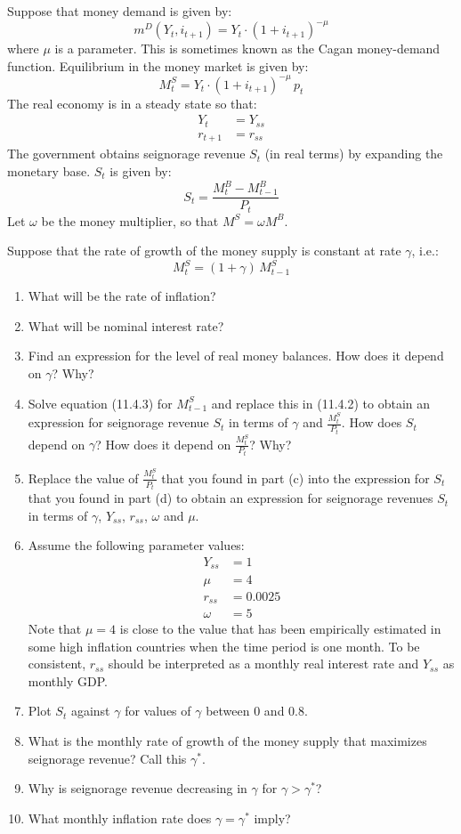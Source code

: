 \noindent Suppose that money demand is given by:
\[
m^D(Y_t,i_{t+1})=Y_t\cdot(1+i_{t+1})^{-\mu}
\]
where $\mu$ is a parameter. This is sometimes known as the Cagan money-demand function. Equilibrium in the money market is given by:
\[
M_t^S=Y_t\cdot(1+i_{t+1})^{-\mu}\,p_t
\]
The real economy is in a steady state so that:
\begin{align*}
Y_t&=Y_{ss}\\
r_{t+1}&=r_{ss}
\end{align*}
The government obtains seignorage revenue $S_t$ (in real terms) by expanding the monetary base. $S_t$ is given by:
\[
S_t=\frac{M_t^B-M_{t-1}^B}{P_t} \tag{11.4.2}
\]
Let $\omega$ be the money multiplier, so that $M^S=\omega M^B$.\par
\noindent Suppose that the rate of growth of the money supply is constant at rate $\gamma$, i.e.:
\[
M_t^S=(1+\gamma)\,M_{t-1}^S \tag{11.4.3}
\]
\begin{enumerate}[label=(\alph*),leftmargin=2.2em,topsep=2pt,itemsep=1pt]
\item What will be the rate of inflation?
\item What will be nominal interest rate?
\item Find an expression for the level of real money balances. How does it depend on $\gamma$? Why?
\item Solve equation (11.4.3) for $M_{t-1}^S$ and replace this in (11.4.2) to obtain an expression for seignorage revenue $S_t$ in terms
of $\gamma$ and $\frac{M_t^S}{P_t}$. How does $S_t$ depend on $\gamma$? How does it depend on $\frac{M_t^S}{P_t}$? Why?
\item Replace the value of $\frac{M_t^S}{P_t}$ that you found in part (c) into the expression for $S_t$ that you found in part (d) to
obtain an expression for seignorage revenues $S_t$ in terms of $\gamma$, $Y_{ss}$, $r_{ss}$, $\omega$ and $\mu$.
\item Assume the following parameter values:
\begin{align*}
Y_{ss}&=1\\
\mu&=4\\
r_{ss}&=0.0025\\
\omega&=5
\end{align*}
Note that $\mu=4$ is close to the value that has been empirically estimated in some high inflation countries when the time period
is one month. To be consistent, $r_{ss}$ should be interpreted as a monthly real interest rate and $Y_{ss}$ as monthly GDP.
\item Plot $S_t$ against $\gamma$ for values of $\gamma$ between 0 and 0.8.
\item What is the monthly rate of growth of the money supply that maximizes seignorage revenue? Call this $\gamma^*$.
\item Why is seignorage revenue decreasing in $\gamma$ for $\gamma>\gamma^*$?
\item What monthly inflation rate does $\gamma=\gamma^*$ imply?
\end{enumerate}
